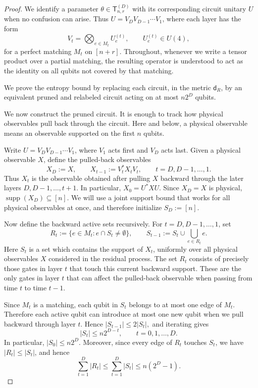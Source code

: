 \documentclass[12pt]{article}
\begin{document}
\begin{proof}
We identify a parameter
\(\theta\in\mathsf{T}_{n,r}^{(D)}\) with its corresponding circuit unitary \(U\) when no
confusion can arise. Thus $U=V_DV_{D-1}\cdots V_1$, where each layer has the form
\[
    V_t
    =
    \bigotimes_{e\in M_t}U_e^{(t)},
    \qquad
    U_e^{(t)}\in U(4),
\]
for a perfect matching \(M_t\) on \([n+r]\). Throughout, whenever we
write a tensor product over a partial matching, the resulting operator is
understood to act as the identity on all qubits not covered by that matching.

We prove the entropy bound by replacing each circuit, in the metric
\(\mathsf{d}_{R}\), by an equivalent pruned and relabeled circuit acting on at most \(n2^D\) qubits.

We now construct the pruned circuit. It is enough to track how physical
observables pull back through the circuit. Here and below, a physical observable means an observable supported on the first \(n\) qubits.

Write $U=V_DV_{D-1}\cdots V_1$, where \(V_1\) acts first and \(V_D\) acts last. Given a physical observable \(X\), define the pulled-back observables
\[
    X_D:=X,
    \qquad
    X_{t-1}:=V_t^*X_tV_t,
    \qquad t=D,D-1,\dots,1.
\]
Thus \(X_t\) is the observable obtained after pulling \(X\) backward through
the later layers \(D,D-1,\dots,t+1\). In particular, $X_0=U^*XU.$
Since \(X_D=X\) is physical, \(\operatorname{supp}(X_D)\subseteq[n]\). We will
use a joint support bound that works for all physical observables at once, and therefore initialize $S_D:=[n].$

Now define the backward active sets recursively. For \(t=D,D-1,\dots,1\), set
\[
    R_t:=\{e\in M_t:e\cap S_t\neq\emptyset\},
    \qquad
    S_{t-1}:=S_t\cup\bigcup_{e\in R_t}e.
\]
Here \(S_t\) is a set which contains the support of $X_t$, uniformly over all physical observables \(X\) considered in the residual process. The
set \(R_t\) consists of precisely those gates in layer \(t\) that touch this
current backward support. These are the only gates in layer \(t\) that can
affect the pulled-back observable when passing from time \(t\) to time
\(t-1\).

Since \(M_t\) is a matching, each qubit in \(S_t\) belongs to at most one edge
of \(M_t\). Therefore each active qubit can introduce at most one new qubit
when we pull backward through layer \(t\). Hence $|S_{t-1}|\le 2|S_t|,$ and iterating gives
\[
    |S_t|\le n2^{D-t},
    \qquad t=0,1,\dots,D.
\]
In particular, \(|S_0|\le n2^D\). Moreover, since every edge of \(R_t\)
touches \(S_t\), we have \(|R_t|\le |S_t|\), and hence
\[
    \sum_{t=1}^D |R_t|
    \le
    \sum_{t=1}^D |S_t|
    \le
    n(2^D-1).
\]


\end{proof}
\end{document}
